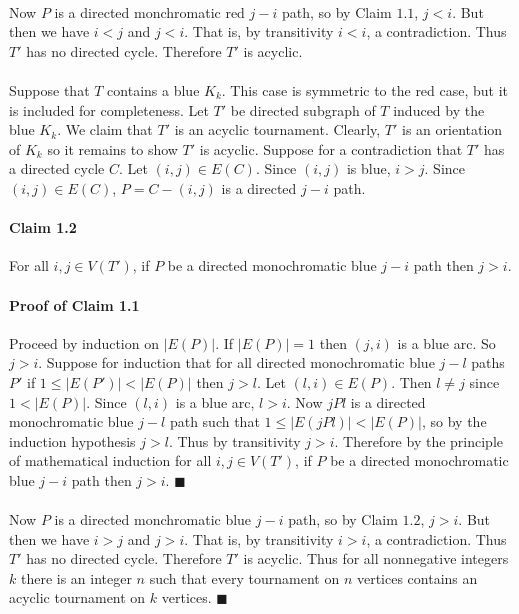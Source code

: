 \documentclass[letterpaper,12pt,oneside,onecolumn]{article}
\begin{document}
\paragraph{}
Now $P$ is a directed monchromatic red $j-i$ path, so by Claim $1.1$, $j<i$. But then we have $i<j$ and $j<i$. That is, by transitivity $i<i$, a contradiction. Thus $T'$ has no directed cycle. Therefore $T'$ is acyclic.
\paragraph{}
Suppose that $T$ contains a blue $K_k$. This case is symmetric to the red case, but it is included for completeness. Let $T'$ be directed subgraph of $T$ induced by the blue $K_k$. We claim that $T'$ is an acyclic tournament. Clearly, $T'$ is an orientation of $K_k$ so it remains to show $T'$ is acyclic. Suppose for a contradiction that $T'$ has a directed cycle $C$. Let $(i,j) \in E(C)$. Since $(i,j)$ is blue, $i > j$. Since $(i,j) \in E(C)$, $P = C -(i,j)$ is a directed $j-i$ path.
\paragraph{Claim 1.2}
For all $i,j \in V(T')$, if $P$ be a directed monochromatic blue $j-i$ path then $j>i$.
\paragraph{Proof of Claim 1.1}
Proceed by induction on $|E(P)|$. If $|E(P)| = 1$ then $(j,i)$ is a blue arc. So $j>i$. Suppose for induction that for all directed monochromatic blue $j-l$ paths $P'$ if $1\leq |E(P')| < |E(P)|$ then $j>l$. Let $(l,i) \in E(P)$. Then $l \neq j$ since $1 < |E(P)|$. Since $(l,i)$ is a blue arc, $l>i$. Now $jPl$ is a directed monochromatic blue $j-l$ path such that $1\leq |E(jPl)| < |E(P)|$, so by the induction hypothesis $j>l$. Thus by transitivity $j > i$. Therefore by the principle of mathematical induction for all $i,j \in V(T')$, if $P$ be a directed monochromatic blue $j-i$ path then $j>i$. $\blacksquare$
\paragraph{}
Now $P$ is a directed monchromatic blue $j-i$ path, so by Claim $1.2$, $j>i$. But then we have $i>j$ and $j>i$. That is, by transitivity $i>i$, a contradiction. Thus $T'$ has no directed cycle. Therefore $T'$ is acyclic. Thus for all nonnegative integers $k$ there is an integer $n$ such that every tournament on $n$ vertices contains an acyclic tournament on $k$ vertices. $\blacksquare$
\end{document}
